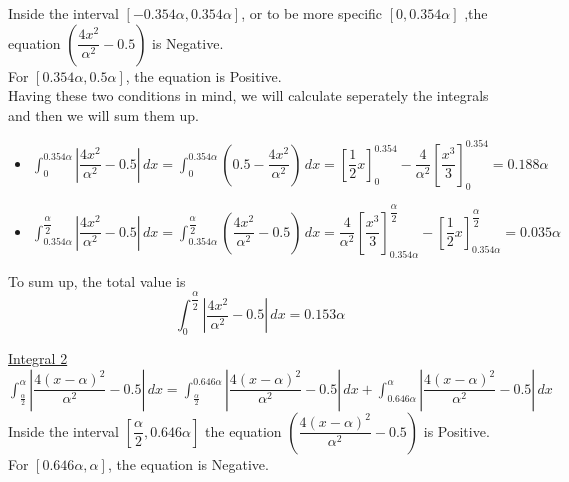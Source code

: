 Inside the interval $[-0.354\alpha, 0.354\alpha]$, or to be more specific $[0, 0.354\alpha]$ ,the equation $\left(\dfrac{4x^2}{\alpha^2} - 0.5\right)$ is Negative.\\
For $[0.354\alpha, 0.5\alpha]$, the equation is Positive.\\

Having these two conditions in mind, we will calculate seperately the integrals and then we will sum them up.
\begin{itemize}
	\item $\displaystyle \int_{0}^{0.354\alpha} \left| \dfrac{4x^2}{\alpha^2} - 0.5 \right| \, dx = \int_{0}^{0.354\alpha}\left(0.5 - \dfrac{4x^2}{\alpha^2}\right)\, dx = \left[\dfrac{1}{2}x\right]^{0.354}_0 - \dfrac{4}{\alpha^2}\left[\dfrac{x^3}{3}\right]^{0.354}_0 = 0.188\alpha$
	\vspace{3mm}
	
	\item $\displaystyle \int_{0.354\alpha}^{\dfrac{\alpha}{2}} \left| \dfrac{4x^2}{\alpha^2} - 0.5 \right| \, dx = \int_{0.354\alpha}^{\dfrac{\alpha}{2}} \left( \dfrac{4x^2}{\alpha^2} - 0.5\right) \, dx = \dfrac{4}{\alpha^2}\left[\dfrac{x^3}{3}\right]^{\dfrac{\alpha}{2}}_{0.354\alpha} - \left[\dfrac{1}{2}x\right]^{\dfrac{\alpha}{2}}_{0.354\alpha} = 0.035\alpha $
\end{itemize}
\vspace{4mm}
To sum up, the total value is \\
\begin{equation}
	\displaystyle\int_{0}^{\dfrac{\alpha}{2}} \left| \dfrac{4x^2}{\alpha^2} - 0.5 \right| \, dx = 0.153\alpha
\end{equation}
\label{eq:integral1}
\vspace{7mm}

\underline{Integral 2}\\

$\displaystyle \int_{\frac{\alpha}{2}}^{\alpha} \left| \dfrac{4(x-\alpha)^2}{\alpha^2} - 0.5 \right| \, dx = \int_{\frac{\alpha}{2}}^{0.646\alpha}\left| \dfrac{4(x-\alpha)^2}{\alpha^2} - 0.5 \right| \, dx + \int_{0.646\alpha}^{\alpha} \left| \dfrac{4(x-\alpha)^2}{\alpha^2} - 0.5 \right| \, dx$
\\

Inside the interval $\left[\dfrac{\alpha}{2}, 0.646\alpha \right]$ the equation $\left(\dfrac{4(x-\alpha)^2}{\alpha^2} - 0.5\right)$ is Positive.\\
For $[0.646\alpha, \alpha]$, the equation is Negative.\\

